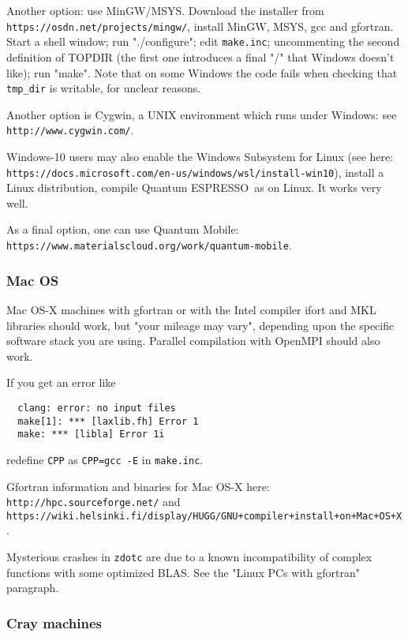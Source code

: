 \documentclass[12pt,a4paper]{article}
\def\qe{{\sc Quantum ESPRESSO}}
\begin{document}
Another option: use MinGW/MSYS. Download the installer from
\texttt{https://osdn.net/projects/mingw/}, install MinGW, MSYS, gcc and
gfortran. Start a shell window; run "./configure"; edit \texttt{make.inc};
uncommenting the second definition of TOPDIR (the first one introduces a
final "/" that Windows doesn't like); run "make". Note that on some Windows
the code fails when checking that \texttt{tmp\_dir} is writable, for unclear
reasons.

Another option is Cygwin, a UNIX environment which runs under Windows: see\\
\texttt{http://www.cygwin.com/}.

Windows-10 users may also enable the Windows Subsystem for Linux (see here:\\
\texttt{https://docs.microsoft.com/en-us/windows/wsl/install-win10}),
install a Linux distribution, compile \qe\ as on Linux. It works very well.

As a final option, one can use Quantum Mobile:\\
\texttt{https://www.materialscloud.org/work/quantum-mobile}.

\subsubsection{Mac OS}

Mac OS-X machines with gfortran or with the Intel compiler ifort
and MKL libraries should work, but "your mileage may vary", depending
upon the specific software stack you are using. Parallel compilation
with OpenMPI should also work.

If you get an error like
\begin{verbatim}
  clang: error: no input files
  make[1]: *** [laxlib.fh] Error 1
  make: *** [libla] Error 1i
\end{verbatim}
redefine \texttt{CPP} as \texttt{CPP=gcc -E} in \texttt{make.inc}.

Gfortran information and binaries for Mac OS-X here:
\texttt{http://hpc.sourceforge.net/} and
\texttt{https://wiki.helsinki.fi/display/HUGG/GNU+compiler+install+on+Mac+OS+X}.

Mysterious crashes in \texttt{zdotc} are due to a known incompatibility of
complex functions with some optimized BLAS. See the "Linux PCs with gfortran"
paragraph.

\subsubsection{Cray machines}
\end{document}
